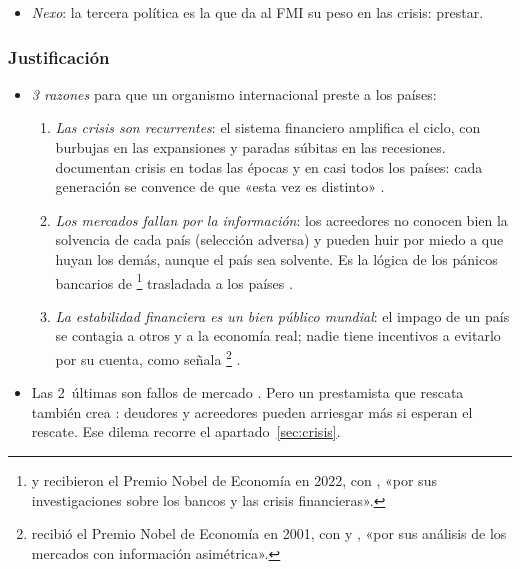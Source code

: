 \documentclass[11pt]{article}
\begin{document}
\begin{itemize}
\item \emph{Nexo}: la tercera política es la que da al FMI su peso en las crisis: prestar.
\end{itemize}

\subsubsection{Justificación}\label{sec:justificacion}

\begin{itemize}
\item \emph{3 razones} para que un organismo internacional preste a los países:
  \begin{enumerate}
  \item \emph{Las crisis son recurrentes}: el sistema financiero amplifica el ciclo, con burbujas en las expansiones y paradas súbitas en las recesiones. \textcite{ReinhartRogoff2009This} documentan crisis en todas las épocas y en casi todos los países: cada generación se convence de que «esta vez es distinto» .
  \item \emph{Los mercados fallan por la información}: los acreedores no conocen bien la solvencia de cada país (selección adversa) y pueden huir por miedo a que huyan los demás, aunque el país sea solvente. Es la lógica de los pánicos bancarios de \textcite{DiamondDybvig1983}\footnote{ y  recibieron el Premio Nobel de Economía en 2022, con , «por sus investigaciones sobre los bancos y las crisis financieras»\nocite{Nobel2022}.} trasladada a los países .
  \item \emph{La estabilidad financiera es un bien público mundial}: el impago de un país se contagia a otros y a la economía real; nadie tiene incentivos a evitarlo por su cuenta, como señala \footnote{ recibió el Premio Nobel de Economía en 2001, con  y , «por sus análisis de los mercados con información asimétrica»\nocite{Nobel2001AkerlofSpenceStiglitz}.}\nocite{Stiglitz2002Globalization} .
  \end{enumerate}
\item Las 2~últimas son fallos de mercado . Pero un prestamista que rescata también crea : deudores y acreedores pueden arriesgar más si esperan el rescate. Ese dilema recorre el apartado~\ref{sec:crisis}.
\end{itemize}
\end{document}
